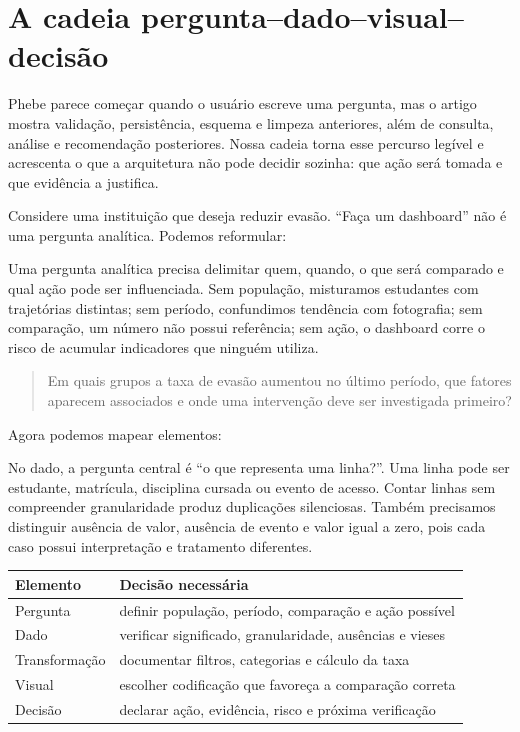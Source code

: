 \section{A cadeia pergunta--dado--visual--decisão}

Phebe parece começar quando o usuário escreve uma pergunta, mas o artigo mostra validação, persistência, esquema e limpeza anteriores, além de consulta, análise e recomendação posteriores. Nossa cadeia torna esse percurso legível e acrescenta o que a arquitetura não pode decidir sozinha: que ação será tomada e que evidência a justifica.

Considere uma instituição que deseja reduzir evasão. ``Faça um dashboard'' não é uma pergunta analítica. Podemos reformular:

Uma pergunta analítica precisa delimitar quem, quando, o que será comparado e qual ação pode ser influenciada. Sem população, misturamos estudantes com trajetórias distintas; sem período, confundimos tendência com fotografia; sem comparação, um número não possui referência; sem ação, o dashboard corre o risco de acumular indicadores que ninguém utiliza.

\begin{quote}
Em quais grupos a taxa de evasão aumentou no último período, que fatores aparecem associados e onde uma intervenção deve ser investigada primeiro?
\end{quote}

Agora podemos mapear elementos:

No dado, a pergunta central é ``o que representa uma linha?''. Uma linha pode ser estudante, matrícula, disciplina cursada ou evento de acesso. Contar linhas sem compreender granularidade produz duplicações silenciosas. Também precisamos distinguir ausência de valor, ausência de evento e valor igual a zero, pois cada caso possui interpretação e tratamento diferentes.

\begin{center}
\begin{tabularx}{\textwidth}{@{}p{3cm}Y@{}}
\toprule
\textbf{Elemento} & \textbf{Decisão necessária} \\
\midrule
Pergunta & definir população, período, comparação e ação possível \\
Dado & verificar significado, granularidade, ausências e vieses \\
Transformação & documentar filtros, categorias e cálculo da taxa \\
Visual & escolher codificação que favoreça a comparação correta \\
Decisão & declarar ação, evidência, risco e próxima verificação \\
\bottomrule
\end{tabularx}
\end{center}

